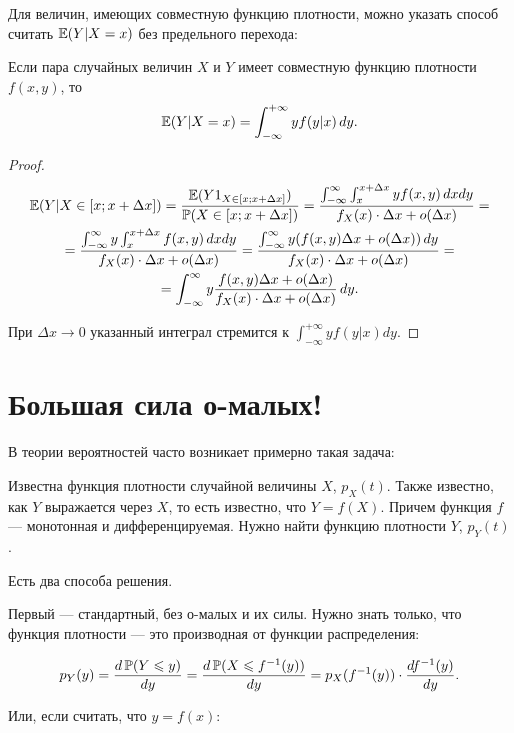 Для величин, имеющих совместную функцию плотности, можно указать способ считать $ \E(Y|X=x) $ без предельного перехода:
\begin{myth} Если пара случайных величин $ X $ и $ Y $ имеет совместную функцию плотности $ f(x,y) $, то
\begin{equation}
\E(Y|X=x)=\int_{-\infty}^{+\infty}yf(y|x) \, dy.
\end{equation}
\end{myth}

\begin{proof}
\begin{multline}
\E(Y|X\in [x;x+\Delta x])=\frac{\E(Y1_{X\in[x;x+\Delta x]})}{\P(X\in[x;x+\Delta x])}=\frac{\int_{-\infty}^{\infty}\int_{x}^{x+\Delta x} y f(x,y) \, dx dy }{f_{X}(x)\cdot \Delta x+o(\Delta x)}= \\
=\frac{\int_{-\infty}^{\infty}y\int_{x}^{x+\Delta x}  f(x,y) \, dx dy }{f_{X}(x)\cdot \Delta x+o(\Delta x)}=\frac{\int_{-\infty}^{\infty}y (f(x,y)\Delta x +o(\Delta x) ) \, dy }{f_{X}(x)\cdot \Delta x+o(\Delta x)}= \\
=\int_{-\infty}^{\infty}y \frac{f(x,y)\Delta x +o(\Delta x) }{f_{X}(x)\cdot \Delta x+o(\Delta x)} \, dy.
\end{multline}

При $ \Delta x\to 0 $ указанный интеграл стремится к $ \int_{-\infty}^{+\infty}yf(y|x)dy $.
\end{proof}



\section{Большая сила о-малых!}

В теории вероятностей часто возникает примерно такая задача:

Известна функция плотности случайной величины $ X $, $ p_{X}(t) $. Также известно, как $ Y $ выражается через $ X $, то есть известно, что $ Y=f(X) $. Причем функция $ f $ — монотонная и дифференцируемая. Нужно найти функцию плотности $ Y $, $ p_{Y}(t) $.

Есть два способа решения.

Первый — стандартный, без о-малых и их силы. Нужно знать только, что функция плотности — это производная от функции распределения:

\[
p_{Y}(y)=\frac{d\P(Y\leq y)}{dy}=\frac{d\P(X\leq f^{-1}(y))}{dy}=p_{X}(f^{-1}(y))\cdot \frac{df^{-1}(y)}{dy}.
\]

Или, если считать, что $ y=f(x) $:

